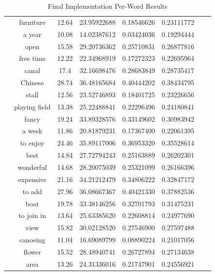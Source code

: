 \documentclass[a4paper]{report}
\begin{document}
\begin{table}[h]
{\begin{tabular}{l*{7}{c}}
         & furniture          & 12.64           & 23.95922688           & 0.18546626 & 0.23111772  \\
         & a year             & 10.08           & 14.02387612           & 0.03424036 & 0.19294444  \\
         & open               & 15.58           & 29.20736362           & 0.25710831 & 0.26877816  \\
         & free time          & 12.22           & 22.34968919           & 0.17272323 & 0.22695964  \\
         & canal              & 17.4            & 32.16698476           & 0.28683849 & 0.28735417  \\
         & Chinese            & 28.74           & 36.48165684           & 0.40444202 & 0.38434795  \\
         & stall              & 12.56           & 23.52746893           & 0.18401725 & 0.23226656  \\
         & playing field      & 13.38           & 25.22488841           & 0.22296496 & 0.24180841  \\
         & fancy              & 19.24           & 33.89328576           & 0.33149602 & 0.30983942  \\
         & a week             & 11.86           & 20.81879231           & 0.17367400 & 0.22061395  \\
         & to enjoy           & 24.46           & 35.89117006           & 0.36953320 & 0.35528614  \\
         & best               & 14.84           & 27.72794243           & 0.25163889 & 0.26202301  \\
         & wonderful          & 14.68           & 28.20075039           & 0.25321099 & 0.26166396  \\
         & expensive          & 21.16           & 34.21212479           & 0.34806222 & 0.32847172  \\
         & to add             & 27.96           & 36.08667367           & 0.40421330 & 0.37882536  \\
         & boat               & 19.78           & 33.38146256           & 0.32701793 & 0.31475231  \\
         & to join in         & 13.64           & 25.63385620           & 0.22608814 & 0.24977690  \\
         & view               & 15.82           & 30.02128520           & 0.27546900 & 0.27597488  \\
         & canoeing           & 11.04           & 16.69089799           & 0.08890224 & 0.21017056  \\
         & flower             & 15.52           & 28.48940741           & 0.26727894 & 0.27134638  \\
         & area               & 13.26           & 24.31336016           & 0.21747901 & 0.24556921  \\
		\bottomrule
	\end{tabular}
	}
	\caption{Final Implementation Per-Word Results}
	\label{tab:final_impl}
\end{table}
\end{document}
